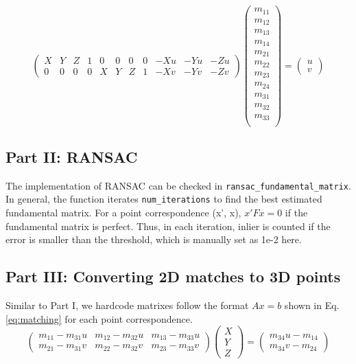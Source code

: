 \setcounter{MaxMatrixCols}{20}
\begin{equation}
    \begin{pmatrix}
        X & Y & Z & 1 & 0 & 0 & 0 & 0 & -Xu & -Yu & -Zu \\
        0 & 0 & 0 & 0 & X & Y & Z & 1 & -Xv & -Yv & -Zv
    \end{pmatrix}
    \begin{pmatrix}
        m_{11} \\ m_{12} \\ m_{13} \\ m_{14} \\ m_{21} \\ m_{22} \\ m_{23} \\ m_{24} \\ m_{31} \\ m_{32} \\ m_{33} \\
    \end{pmatrix}
    =
    \begin{pmatrix}
        u \\ v
    \end{pmatrix}
    \label{eq:projection}
\end{equation}

\subsection*{Part II: RANSAC}
The implementation of RANSAC can be checked in \texttt{ransac\_fundamental\_matrix}. In general, the function iterates \texttt{num\_iterations} to find the best estimated fundamental matrix. For a point correspondence (x', x), \(x'Fx=0\) if the fundamental matrix is perfect. Thus, in each iteration, inlier is counted if the error is smaller than the threshold, which is manually set as 1e-2 here.

\subsection*{Part III: Converting 2D matches to 3D points}
Similar to Part I, we hardcode matrixes follow the format \(Ax=b\) shown in Eq. \ref{eq:matching} for each point correspondence.
\begin{equation}
    \begin{pmatrix}
        m_{11} - m_{31}u & m_{12} - m_{32}u & m_{13} - m_{33}u \\
        m_{21} - m_{31}v & m_{22} - m_{32}v & m_{23} - m_{33}v
    \end{pmatrix}
    \begin{pmatrix}
        X \\ Y \\ Z
    \end{pmatrix}
    =
    \begin{pmatrix}
        m_{34}u - m_{14} \\ m_{34}v - m_{24}
    \end{pmatrix}
    \label{eq:matching}
\end{equation}

